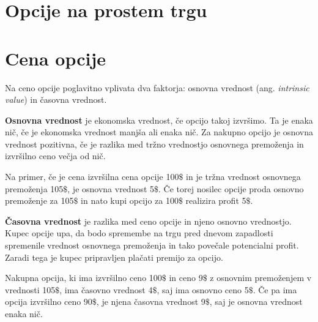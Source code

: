 \documentclass[a4paper]{article}
\begin{document}
\section{Opcije na prostem trgu}


\section{Cena opcije}
Na ceno opcije poglavitno vplivata dva faktorja: osnovna vrednost (ang. \textit{intrinsic value}) in časovna vrednost.

\textbf{Osnovna vrednost} je ekonomska vrednost, če opcijo takoj izvršimo. Ta je enaka nič, če je ekonomska vrednost manjša ali enaka nič.
Za nakupno opcijo je osnovna vrednost pozitivna, če je razlika med tržno vrednostjo osnovnega premoženja in izvršilno ceno večja od nič.

Na primer, če je cena izvršilna cena opcije 100$\$$ in je tržna vrednost osnovnega premoženja 105$\$$, je osnovna vrednost 5$\$$. 
Če torej nosilec opcije proda osnovno premoženje za 105$\$$ in nato kupi opcijo za 100$\$$ realizira profit 5$\$$.

\textbf{Časovna vrednost} je razlika med ceno opcije in njeno osnovno vrednostjo. Kupec opcije upa, da bodo spremembe na trgu pred
dnevom zapadlosti spremenile vrednost osnovnega premoženja in tako povečale potencialni profit. Zaradi tega je kupec pripravljen plačati
premijo za opcijo. 

Nakupna opcija, ki ima izvršilno ceno 100$\$$ in ceno 9$\$$ z osnovnim premoženjem v vrednosti 105$\$$, ima časovno vrednost 4$\$$,
saj ima osnovno ceno 5$\$$. Če pa ima opcija izvršilno ceno 90$\$$, je njena časovna vrednost 9$\$$, saj je osnovna vrednost enaka nič.
\end{document}
